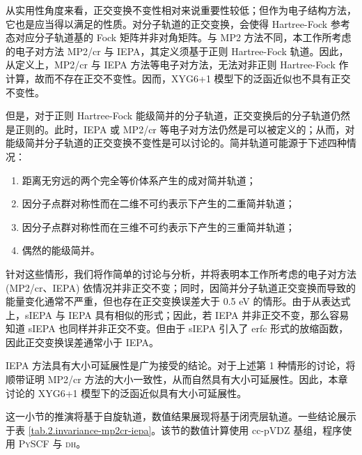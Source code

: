 从实用性角度来看，正交变换不变性相对来说重要性较低；但作为电子结构方法，它也是应当得以满足的性质。对分子轨道的正交变换，会使得 Hartree-Fock 参考态对应分子轨道基的 Fock 矩阵并非对角矩阵。与 MP2 方法不同，本工作所考虑的电子对方法 MP2/cr 与 IEPA，其定义须基于正则 Hartree-Fock 轨道。因此，从定义上，MP2/cr 与 IEPA 方法等电子对方法，无法对非正则 Hartree-Fock 作计算，故而不存在正交不变性。因而，XYG6+1 模型下的泛函近似也不具有正交不变性。

但是，对于正则 Hartree-Fock 能级简并的分子轨道，正交变换后的分子轨道仍然是正则的。此时，IEPA 或 MP2/cr 等电子对方法仍然是可以被定义的；从而，对能级简并分子轨道的正交变换不变性是可以讨论的。简并轨道可能源于下述四种情况：
\begin{enumerate}[nosep]
  \item 距离无穷远的两个完全等价体系产生的成对简并轨道；
  \item 因分子点群对称性而在二维不可约表示下产生的二重简并轨道；
  \item 因分子点群对称性而在三维不可约表示下产生的三重简并轨道；
  \item 偶然的能级简并。
\end{enumerate}
针对这些情形，我们将作简单的讨论与分析，并将表明本工作所考虑的电子对方法 (MP2/cr、IEPA) 依情况并非正交不变；同时，因简并分子轨道正交变换而导致的能量变化通常不严重，但也存在正交变换误差大于 0.5 eV 的情形。由于从表达式上，sIEPA 与 IEPA 具有相似的形式；因此，若 IEPA 并非正交不变，那么容易知道 sIEPA 也同样并非正交不变。但由于 sIEPA 引入了 erfc 形式的放缩函数，因此正交变换误差通常小于 IEPA。

IEPA 方法具有大小可延展性是广为接受的结论\cite{Szabo-Ostlund.Dover.1996}。对于上述第 1 种情形的讨论，将顺带证明 MP2/cr 方法的大小一致性，从而自然具有大小可延展性。因此，本章讨论的 XYG6+1 模型下的泛函近似具有大小可延展性。

这一小节的推演将基于自旋轨道，数值结果展现将基于闭壳层轨道。一些结论展示于表 \ref{tab.2.invariance-mp2cr-iepa}。该节的数值计算使用 cc-pVDZ 基组，程序使用 \textsc{PySCF} 与 \textsc{dh}。

\begin{table}[ht]
\centering
\caption[MP2/cr 与 IEPA 在不同情形下的正交变换不变性]{MP2/cr 与 IEPA 在不同情形下能级简并轨道间的正交变换不变性。}
\label{tab.2.invariance-mp2cr-iepa}
\end{table}

